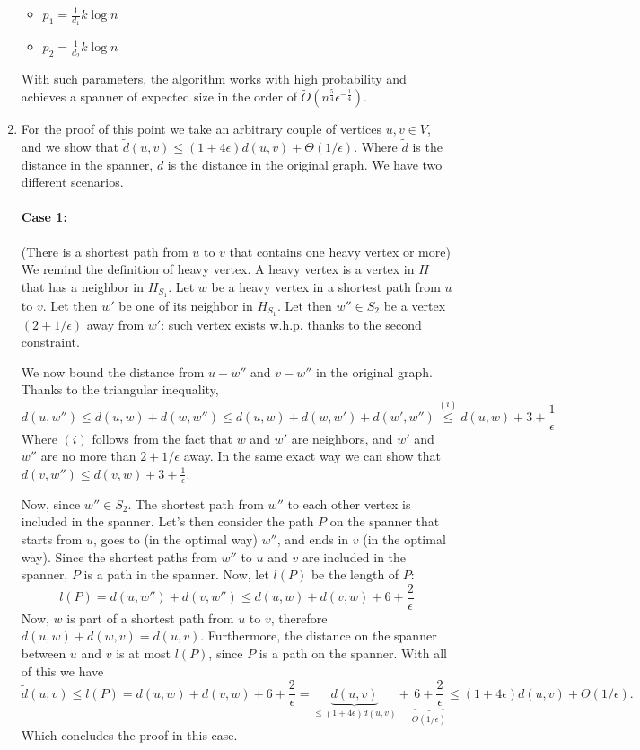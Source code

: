 \documentclass[11pt]{article}
\begin{document}
\begin{enumerate}
\begin{itemize}
        \item $p_1 = \frac{1}{d_1}k\log n$
        \item $p_2 = \frac{1}{d_2}k\log n$
    \end{itemize}
    With such parameters, the algorithm works with high probability and achieves a spanner of expected size in the order of $\tilde O \left(n^{\frac{5}{4}}\epsilon^{-\frac{1}{4}}\right)$.
    \item For the proof of this point we take an arbitrary couple of vertices $u,v \in V$, and we show that $\tilde d(u,v) \leq (1+4\epsilon)d(u,v) + \Theta(1/\epsilon)$. Where $\tilde d$ is the distance in the spanner, $d$ is the distance in the original graph. We have two different scenarios.
    \paragraph{Case 1:} (There is a shortest path from $u$ to $v$ that contains one heavy vertex or more)
    We remind the definition of heavy vertex. A heavy vertex is a vertex in $H$ that has a neighbor in $H_{S_1}$. Let $w$ be a heavy vertex in a shortest path from $u$ to $v$. Let then $w'$ be one of its neighbor in $H_{S_1}$. Let then $w'' \in S_2$ be a vertex $(2+1/\epsilon)$ away from $w'$: such vertex exists w.h.p. thanks to the second constraint.

    We now bound the distance from $u-w''$ and $v-w''$ in the original graph. Thanks to the triangular inequality,
    \begin{equation*}
        d(u,w'') \leq d(u,w) + d(w,w'') \leq d(u,w) +d(w,w') + d(w',w'') \stackrel{(i)}{\leq} d(u,w) + 3 + \frac{1}{\epsilon}
    \end{equation*}
    Where $(i)$ follows from the fact that $w$ and $w'$ are neighbors, and $w'$ and $w''$ are no more than $2+1/\epsilon$ away. In the same exact way we can show that $d(v,w'') \leq d(v,w) + 3 + \frac{1}{\epsilon}$. 

    Now, since $w''\in S_2$. The shortest path from $w''$ to each other vertex is included in the spanner. Let's then consider the path $P$ on the spanner that starts from $u$, goes to (in the optimal way) $w''$, and ends in $v$ (in the optimal way). Since the shortest paths from $w''$ to $u$ and $v$ are included in the spanner, $P$ is a path in the spanner. Now, let $l(P)$ be the length of $P$:
    \begin{equation*}
        l(P) = d(u,w'') + d(v,w'') \leq d(u,w) + d(v,w) + 6 + \frac{2}{\epsilon}
    \end{equation*}
    Now, $w$ is part of a shortest path from $u$ to $v$, therefore $d(u,w)+d(w,v)=d(u,v)$. Furthermore, the distance on the spanner between $u$ and $v$ is at most $l(P)$, since $P$ is a path on the spanner. With all of this we have
    \begin{equation*}
        \tilde d (u,v) \leq l(P) = d(u,w) + d(v,w) + 6+ \frac{2}{\epsilon} = \underbrace{d(u,v)}_{\leq (1+4\epsilon)d(u,v)} + \underbrace{6+ \frac{2}{\epsilon}}_{\Theta(1/\epsilon)} \leq (1+4\epsilon)d (u,v) + \Theta(1/\epsilon).
    \end{equation*}
    Which concludes the proof in this case.

\end{enumerate}
\end{document}
